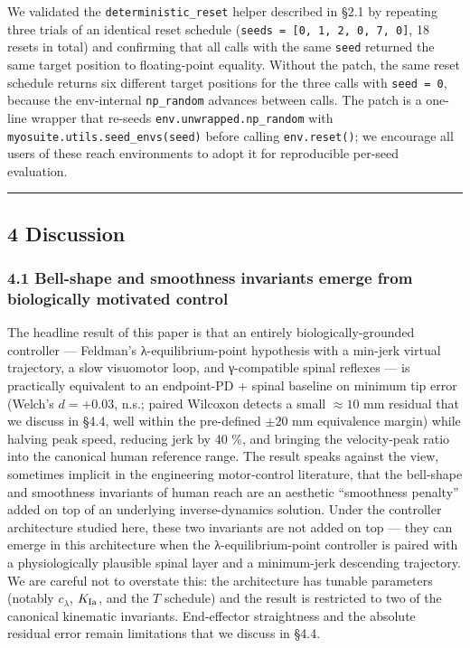 \documentclass[
  11pt,
]{article}
\begin{document}
We validated the \texttt{deterministic\_reset} helper described in §2.1
by repeating three trials of an identical reset schedule
(\texttt{seeds\ =\ {[}0,\ 1,\ 2,\ 0,\ 7,\ 0{]}}, 18 resets in total) and
confirming that all calls with the same \texttt{seed} returned the same
target position to floating-point equality. Without the patch, the same
reset schedule returns six different target positions for the three
calls with \texttt{seed\ =\ 0}, because the env-internal
\texttt{np\_random} advances between calls. The patch is a one-line
wrapper that re-seeds \texttt{env.unwrapped.np\_random} with
\texttt{myosuite.utils.seed\_envs(seed)} before calling
\texttt{env.reset()}; we encourage all users of these reach environments
to adopt it for reproducible per-seed evaluation.

\begin{center}\rule{0.5\linewidth}{0.5pt}\end{center}

\hypertarget{discussion}{%
\subsection{4 Discussion}\label{discussion}}

\hypertarget{bell-shape-and-smoothness-invariants-emerge-from-biologically-motivated-control}{%
\subsubsection{4.1 Bell-shape and smoothness invariants emerge from
biologically motivated
control}\label{bell-shape-and-smoothness-invariants-emerge-from-biologically-motivated-control}}

The headline result of this paper is that an entirely
biologically-grounded controller --- Feldman's λ-equilibrium-point
hypothesis with a min-jerk virtual trajectory, a slow visuomotor loop,
and γ-compatible spinal reflexes --- is practically equivalent to an
endpoint-PD + spinal baseline on minimum tip error (Welch's
\(d = +0.03\), n.s.; paired Wilcoxon detects a small \(\approx 10\) mm
residual that we discuss in §4.4, well within the pre-defined \(\pm 20\)
mm equivalence margin) while halving peak speed, reducing jerk by 40 \%,
and bringing the velocity-peak ratio into the canonical human reference
range. The result speaks against the view, sometimes implicit in the
engineering motor-control literature, that the bell-shape and smoothness
invariants of human reach are an aesthetic ``smoothness penalty'' added
on top of an underlying inverse-dynamics solution. Under the controller
architecture studied here, these two invariants are not added on top ---
they can emerge in this architecture when the λ-equilibrium-point
controller is paired with a physiologically plausible spinal layer and a
minimum-jerk descending trajectory. We are careful not to overstate
this: the architecture has tunable parameters (notably \(c_{\lambda}\),
\(K_{\rm Ia}\), and the \(T\) schedule) and the result is restricted to
two of the canonical kinematic invariants. End-effector straightness and
the absolute residual error remain limitations that we discuss in §4.4.
\end{document}
